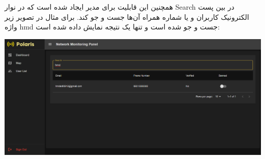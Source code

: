 \begin{itemize}
\begin{center}
    		\end{center}
   		همچنین این قابلیت برای مدیر ایجاد شده است که در نوار Search در بین پست الکترونیک کاربران و یا شماره همراه آن‌ها جست و جو کند. برای مثال در تصویر زیر واژه hmd جست و جو شده است و تنها یک نتیجه نمایش داده شده است:
   		\begin{center}
   			\includegraphics[width=\textwidth]{images/fr-userlist-search.png}
   		\end{center}
   		
    \end{itemize}

